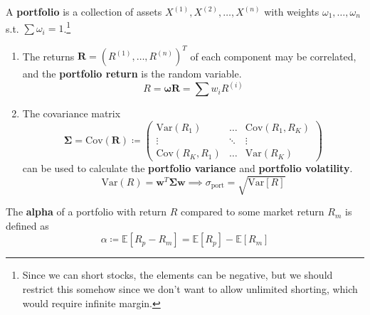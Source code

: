 \documentclass{article}
\begin{document}
  \begin{definition}[Portfolio]
    \label{def:portfolio}
    A \textbf{portfolio} is a collection of assets $X^{(1)}, X^{(2)}, \ldots, X^{(n)}$ with weights $\omega_1, \ldots, \omega_n$ s.t. $\sum \omega_i = 1$.\footnote{Since we can short stocks, the elements can be negative, but we should restrict this somehow since we don't want to allow unlimited shorting, which would require infinite margin. } 
    \begin{enumerate}
      \item The returns $\mathbf{R} = (R^{(1)}, \ldots, R^{(n)})^T$ of each component may be correlated, and the \textbf{portfolio return} is the random variable. 
        \begin{equation}
          R = \boldsymbol{\omega} \mathbf{R} = \sum w_i R^{(i)}
        \end{equation}

      \item The covariance matrix
      \begin{equation}
        \boldsymbol{\Sigma} = \mathrm{Cov}(\mathbf{R}) \coloneqq \begin{pmatrix} \mathrm{Var}(R_1) & \ldots & \mathrm{Cov}(R_1, R_K) \\ \vdots & \ddots & \vdots \\ \mathrm{Cov}(R_K, R_1) & \ldots & \mathrm{Var}(R_K) \end{pmatrix} 
      \end{equation}
      can be used to calculate the \textbf{portfolio variance} and \textbf{portfolio volatility}. 
      \begin{equation}
        \mathrm{Var}(R) = \mathbf{w}^T \boldsymbol{\Sigma} \mathbf{w} \implies \sigma_{\mathrm{port}} = \sqrt{\mathrm{Var}[R]}
      \end{equation}
    \end{enumerate}
  \end{definition}

  \begin{definition}[Alpha]
    \label{def:alpha}
    The \textbf{alpha} of a portfolio with return $R$ compared to some market return $R_m$ is defined as 
    \begin{equation}
      \alpha \coloneqq \mathbb{E}[R_p - R_m] = \mathbb{E}[R_p] - \mathbb{E}[R_m]
    \end{equation}
  \end{definition}
\end{document}
